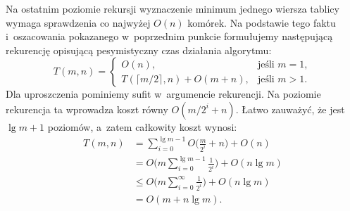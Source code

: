\subproblem %
Na ostatnim poziomie rekursji wyznaczenie minimum jednego wiersza tablicy wymaga sprawdzenia co najwyżej $O(n)$ komórek. Na podstawie tego faktu i~oszacowania pokazanego w~poprzednim punkcie formułujemy następującą rekurencję opisującą pesymistyczny czas działania algorytmu:
\[
	T(m,n) =
	\begin{cases}
		O(n), & \text{jeśli $m=1$}, \\
		T(\lceil m/2\rceil,n)+O(m+n), & \text{jeśli $m>1$}.
	\end{cases}
\]
Dla uproszczenia pominiemy sufit w~argumencie rekurencji. Na  poziomie rekurencja ta wprowadza koszt równy $O(m/2^i+n)$. Łatwo zauważyć, że jest $\lg m+1$ poziomów, a~zatem całkowity koszt wynosi:
\begin{align*}
	T(m,n) &= \sum_{i=0}^{\lg m-1}O\biggl(\frac{m}{2^i}+n\biggr)+O(n) \\
	&= O\biggl(m\sum_{i=0}^{\lg m-1}\frac{1}{2^i}\biggr)+O(n\lg m) \\
	&\le O\biggl(m\sum_{i=0}^\infty\frac{1}{2^i}\biggr)+O(n\lg m) \\[1mm]
	&= O(m+n\lg m).
\end{align*}

\endinput
